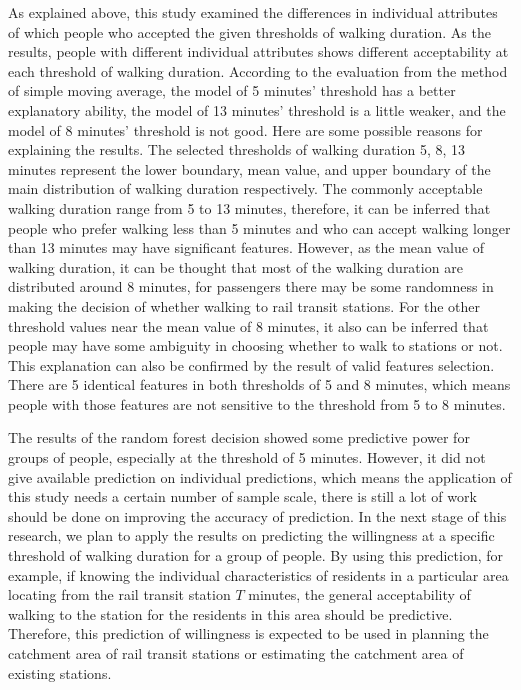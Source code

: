 %
As explained above, this study examined the differences in individual attributes of which people who accepted the given thresholds of walking duration. As the results, people with different individual attributes shows different acceptability at each threshold of walking duration. According to the evaluation from the method of simple moving average, the model of 5 minutes’ threshold has a better explanatory ability, the model of 13 minutes' threshold is a little weaker, and the model of 8 minutes' threshold is not good. Here are some possible reasons for explaining the results. The selected thresholds of walking duration 5, 8, 13 minutes represent the lower boundary, mean value, and upper boundary of the main distribution of walking duration respectively. The commonly acceptable walking duration range from 5 to 13 minutes, therefore, it can be inferred that people who prefer walking less than 5 minutes and who can accept walking longer than 13 minutes may have significant features. However, as the mean value of walking duration, it can be thought that most of the walking duration are distributed around 8 minutes, for passengers there may be some randomness in making the decision of whether walking to rail transit stations. For the other threshold values near the mean value of 8 minutes, it also can be inferred that people may have some ambiguity in choosing whether to walk to stations or not. This explanation can also be confirmed by the result of valid features selection. There are 5 identical features in both thresholds of 5 and 8 minutes, which means people with those features are not sensitive to the threshold from 5 to 8 minutes.

%
The results of the random forest decision showed some predictive power for groups of people, especially at the threshold of 5 minutes. However, it did not give available prediction on individual predictions, which means the application of this study needs a certain number of sample scale, there is still a lot of work should be done on improving the accuracy of prediction. In the next stage of this research, we plan to apply the results on predicting the willingness at a specific threshold of walking duration for a group of people. By using this prediction, for example, if knowing the individual characteristics of residents in a particular area locating from the rail transit station $T$ minutes, the general acceptability of walking to the station for the residents in this area should be predictive. Therefore, this prediction of willingness is expected to be used in planning the catchment area of rail transit stations or estimating the catchment area of existing stations.

\clearpage %

% 
